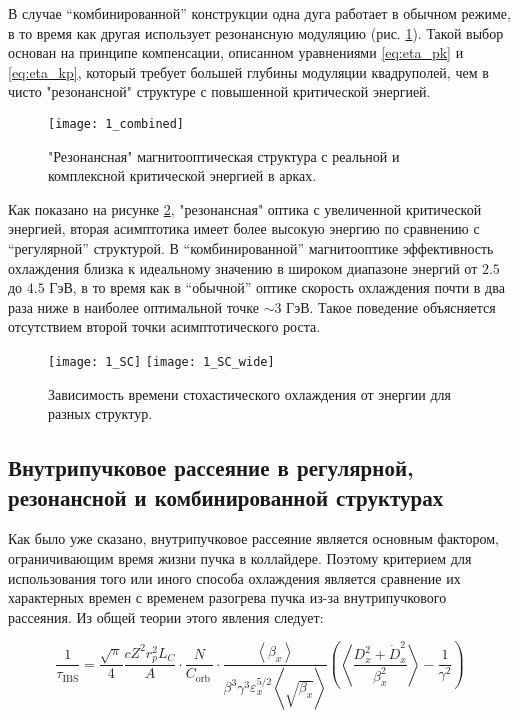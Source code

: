 \noindent В случае “комбинированной” конструкции одна дуга работает в обычном режиме, в то время как другая использует резонансную модуляцию (рис. \ref{fig:1_combined}). Такой выбор основан на принципе компенсации, описанном уравнениями \ref{eq:eta_pk} и \ref{eq:eta_kp}, который требует большей глубины модуляции квадруполей, чем в чисто "резонансной" структуре с повышенной критической энергией.

\begin{figure}[!h]
  \centering
   \texttt{[image: 1\_combined]}
   \caption{"Резонансная" магнитооптическая структура с реальной и комплексной критической энергией в арках.}
   \label{fig:1_combined}
\end{figure}

\noindent Как показано на рисунке \ref{fig:1_SC}, "резонансная" оптика с увеличенной критической энергией, вторая асимптотика имеет более высокую энергию по сравнению с “регулярной” структурой. В “комбинированной” магнитооптике эффективность охлаждения близка к идеальному значению в широком диапазоне энергий от $2.5$ до $4.5$ ГэВ, в то время как в “обычной” оптике скорость охлаждения почти в два раза ниже в наиболее оптимальной точке $\sim3$ ГэВ. Такое поведение объясняется отсутствием второй точки асимптотического роста.

\begin{figure}[!h]
  \centering
   \texttt{[image: 1\_SC]}
   \texttt{[image: 1\_SC\_wide]}
   \caption{Зависимость времени стохастического охлаждения от энергии для разных структур.}
   \label{fig:1_SC}
\end{figure}

\newpage
\subsection{Внутрипучковое рассеяние в регулярной, резонансной и комбинированной структурах}\label{sec:ions_light/IBS_res_reg}

\par  Как было уже сказано, внутрипучковое рассеяние является основным фактором, ограничивающим время жизни пучка в коллайдере. Поэтому критерием для использования того или иного способа охлаждения является сравнение их характерных времен с временем разогрева пучка из-за внутрипучкового рассеяния. Из общей теории этого явления следует:

\begin{equation}
\frac{1}{\tau_{\textrm{IBS}}}=\frac{\sqrt\pi}{4}\frac{cZ^2r_p^2L_C}{A}\cdot\frac{N}{C_{\mathrm{orb\ }}}\cdot\frac{\left\langle\beta_x\right\rangle}{\beta^3\gamma^3\varepsilon_x^{5/2}\left\langle\sqrt{\beta_x}\right\rangle}\left(\left\langle\frac{D_x^2+{\dot{D}}_x^2}{\beta_x^2}\right\rangle-\frac{1}{\gamma^2}\right)
\end{equation}


